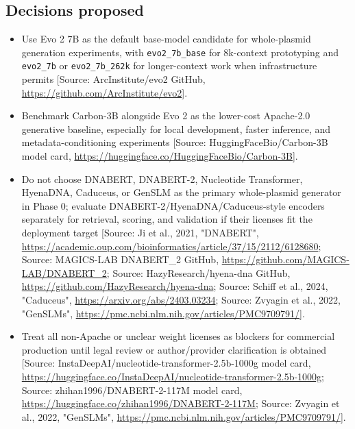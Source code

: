 \documentclass[11pt]{report}
\begin{document}
\subsection{Decisions proposed}
\begin{itemize}
\item Use Evo 2 7B as the default base-model candidate for whole-plasmid generation experiments, with \texttt{evo2\_7b\_base} for 8k-context prototyping and \texttt{evo2\_7b} or \texttt{evo2\_7b\_262k} for longer-context work when infrastructure permits [Source: ArcInstitute/evo2 GitHub, \url{https://github.com/ArcInstitute/evo2}].
\item Benchmark Carbon-3B alongside Evo 2 as the lower-cost Apache-2.0 generative baseline, especially for local development, faster inference, and metadata-conditioning experiments [Source: HuggingFaceBio/Carbon-3B model card, \url{https://huggingface.co/HuggingFaceBio/Carbon-3B}].
\item Do not choose DNABERT, DNABERT-2, Nucleotide Transformer, HyenaDNA, Caduceus, or GenSLM as the primary whole-plasmid generator in Phase 0; evaluate DNABERT-2/HyenaDNA/Caduceus-style encoders separately for retrieval, scoring, and validation if their licenses fit the deployment target [Source: Ji et al., 2021, "DNABERT", \url{https://academic.oup.com/bioinformatics/article/37/15/2112/6128680}; Source: MAGICS-LAB DNABERT\_2 GitHub, \url{https://github.com/MAGICS-LAB/DNABERT_2}; Source: HazyResearch/hyena-dna GitHub, \url{https://github.com/HazyResearch/hyena-dna}; Source: Schiff et al., 2024, "Caduceus", \url{https://arxiv.org/abs/2403.03234}; Source: Zvyagin et al., 2022, "GenSLMs", \url{https://pmc.ncbi.nlm.nih.gov/articles/PMC9709791/}].
\item Treat all non-Apache or unclear weight licenses as blockers for commercial production until legal review or author/provider clarification is obtained [Source: InstaDeepAI/nucleotide-transformer-2.5b-1000g model card, \url{https://huggingface.co/InstaDeepAI/nucleotide-transformer-2.5b-1000g}; Source: zhihan1996/DNABERT-2-117M model card, \url{https://huggingface.co/zhihan1996/DNABERT-2-117M}; Source: Zvyagin et al., 2022, "GenSLMs", \url{https://pmc.ncbi.nlm.nih.gov/articles/PMC9709791/}].
\end{itemize}
\end{document}
